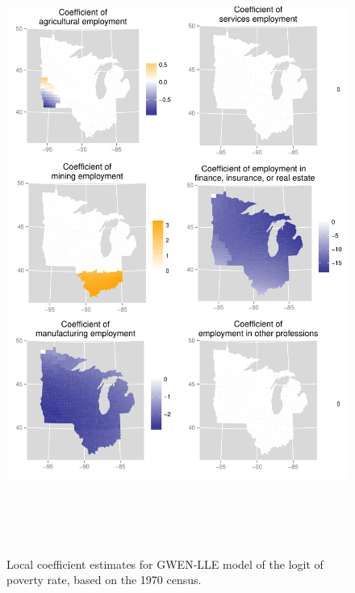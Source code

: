 \documentclass[authoryear, review, 11pt]{elsarticle}
\begin{document}
	\begin{figure}
		\begin{center}
			\includegraphics[height=8in]{../../figures/poverty/1970-GWEN-coefficients}
			\caption{Local coefficient estimates for GWEN-LLE model of the logit of poverty rate, based on the 1970 census. \label{fig:unshrunk-enet-coefs-1970}}
		\end{center}
	\end{figure}	
		
\end{document}
